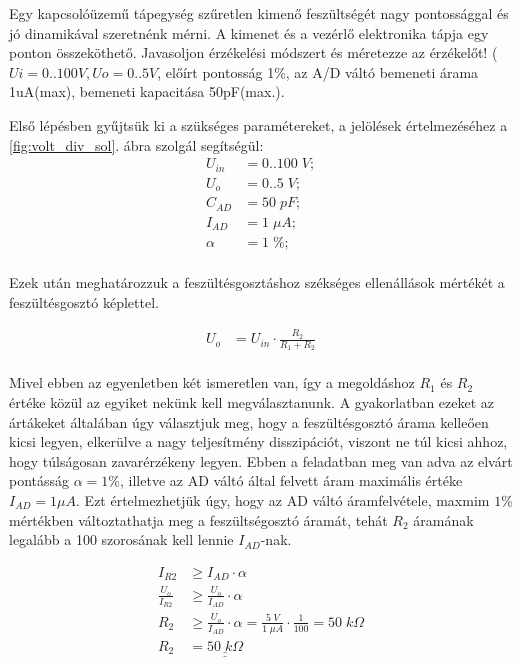 \begin{example2}

Egy kapcsolóüzemű tápegység szűretlen kimenő feszültségét nagy pontossággal és jó dinamikával szeretnénk mérni. A kimenet és a vezérlő elektronika tápja egy ponton összeköthető. Javasoljon érzékelési módszert és méretezze az érzékelőt! ($Ui=0..100V, Uo=0..5V$, előírt pontosság 1\%, az A/D váltó bemeneti árama 1uA(max), bemeneti kapacitása 50pF(max.).
\end{example2}
Első lépésben gyűjtsük ki a szükséges paramétereket, a jelölések értelmezéséhez a \ref{fig:volt_div_sol}. ábra szolgál segítségül:
\begin{equation}
\begin{aligned}{}
    U_{in} &= 0..100\; V; \\
    U_o &= 0..5\; V; \\
    C_{AD} &= 50\; pF; \\
    I_{AD} &= 1\; \mu{}A; \\
    \alpha{} &= 1\; \%; \\
\end{aligned}
\end{equation}

Ezek után meghatározzuk a feszültésgosztáshoz székséges ellenállások mértékét a feszültésgosztó képlettel.

\begin{equation}
\begin{aligned}{}
    U_{o} &= U_{in} \cdot \frac{R_2}{R_1 + R_2} \\
\end{aligned}
\end{equation}

Mivel ebben az egyenletben két ismeretlen van, így a megoldáshoz $R_1$ és $R_2$ értéke közül az egyiket nekünk kell megválasztanunk. A gyakorlatban ezeket az ártákeket általában úgy választjuk meg, hogy a feszültésgosztó árama kelleően kicsi legyen, elkerülve a nagy teljesítmény disszipációt, viszont ne túl kicsi ahhoz, hogy túlságosan zavarérzékeny legyen. Ebben a feladatban meg van adva az elvárt pontásság $\alpha{} = 1 \%$, illetve az AD váltó által felvett áram maximális értéke $I_{AD} = 1 \mu{}A$. Ezt értelmezhetjük úgy, hogy az AD váltó áramfelvétele, maxmim $1\%$ mértékben változtathatja meg a feszültségosztó áramát, tehát $R_2$ áramának legalább a 100 szorosának kell lennie $I_{AD}$-nak.

\begin{equation}
\begin{aligned}{}
    I_{R2} &\geq I_{AD} \cdot \alpha{} \\
    \frac{U_o}{I_{R2}} &\geq \frac{U_o}{I_{AD}} \cdot \alpha{} \\
    R_{2} &\geq \frac{U_o}{I_{AD}} \cdot \alpha{} = \frac{5\;V}{1\;\mu{}A} \cdot \frac{1}{100} = 50\; k\Omega{} \\
    R_2 &= \underline{\underline{50\; k\Omega{}}}
\end{aligned}
\end{equation}

